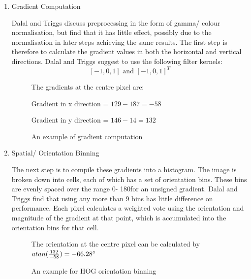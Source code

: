 \begin{enumerate}
    \item Gradient Computation
    
    Dalal and Triggs discuss preprocessing in the form of gamma/ colour normalisation, but find that it has little effect, possibly due to the normalisation in later steps achieving the same results. The first step is therefore to calculate the gradient values in both the horizontal and vertical directions. Dalal and Triggs suggest to use the following filter kernels:
    \[ [-1, 0, 1] \text{ and } [-1, 0, 1]^T \]
    
    
    \begin{figure}[H]
        \caption{An example of gradient computation}
        \centering
        
        The gradients at the centre pixel are:
        
        Gradient in x direction = $129 - 187 = -58$
        
        Gradient in y direction = $146 - 14 = 132$
    \end{figure}
    
    
    \item Spatial/ Orientation Binning
    
    The next step is to compile these gradients into a histogram. The image is broken down into cells, each of which has a set of orientation bins. These bins are evenly spaced over the range 0\degree - 180\degree for an unsigned gradient. Dalal and Triggs find that using any more than 9 bins has little difference on performance. Each pixel calculates a weighted vote using the orientation and magnitude of the gradient at that point, which is accumulated into the orientation bins for that cell.
    
    \begin{figure}[H]
        \caption{An example for HOG orientation binning}
        \centering
        The orientation at the centre pixel can be calculated by $atan(\frac{132}{-58}) = -66.28\degree$
        

\end{figure}
\end{enumerate}
